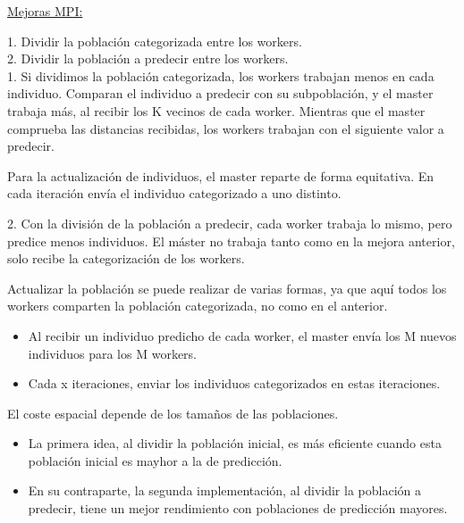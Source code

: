 		\begin{flushleft}
			\underline{Mejoras MPI:}
		\end{flushleft}
		1. Dividir la población categorizada entre los workers. \\
		2. Dividir la población a predecir entre los workers. \\
		
		1. Si dividimos la población categorizada, los workers trabajan menos en cada individuo. Comparan el individuo a predecir con su subpoblación, y el master trabaja más, al recibir los K vecinos de cada worker.  Mientras que el master comprueba las distancias recibidas, los workers trabajan con el siguiente valor a predecir. 
		
		Para la actualización de individuos, el master reparte de forma equitativa. En cada iteración envía el individuo categorizado a uno distinto.
		
		2. Con la división de la población a predecir, cada worker trabaja lo mismo, pero predice menos individuos. El máster no trabaja tanto como en la mejora anterior, solo recibe la categorización de los workers. 
		
		Actualizar la población se puede realizar de varias formas, ya que aquí todos los workers comparten la población categorizada, no como en el anterior.
		
		\begin{itemize}
			\item Al recibir un individuo predicho de cada worker, el master envía los M nuevos individuos para los M workers. 			
			\item Cada x iteraciones, enviar los individuos categorizados en estas iteraciones.
		\end{itemize}

		\begin{flushleft}
			El coste espacial depende de los tamaños de las poblaciones.		
		\end{flushleft}
		\begin{itemize}
			\item La primera idea, al dividir la población inicial, es más eficiente cuando esta población inicial es mayhor a la de predicción. 
			\item En su contraparte, la segunda implementación, al dividir la población a predecir, tiene un mejor rendimiento con poblaciones de predicción mayores.
		\end{itemize}
		
